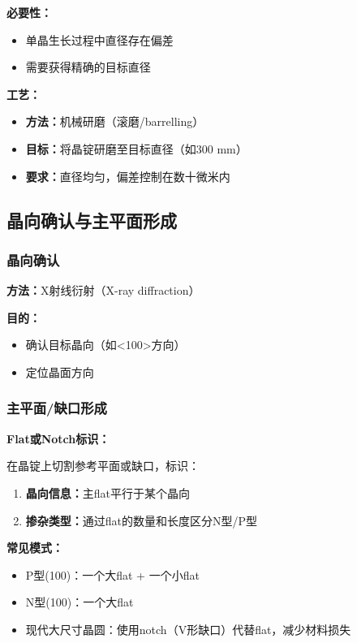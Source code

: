 \documentclass[UTF8,12pt,a4paper]{ctexart}
\begin{document}
\textbf{必要性：}
\begin{itemize}
    \item 单晶生长过程中直径存在偏差
    \item 需要获得精确的目标直径
\end{itemize}

\textbf{工艺：}
\begin{itemize}
    \item \textbf{方法：}机械研磨（滚磨/barrelling）
    \item \textbf{目标：}将晶锭研磨至目标直径（如300 mm）
    \item \textbf{要求：}直径均匀，偏差控制在数十微米内
\end{itemize}

\subsection{晶向确认与主平面形成}

\subsubsection{晶向确认}

\textbf{方法：}X射线衍射（X-ray diffraction）

\textbf{目的：}
\begin{itemize}
    \item 确认目标晶向（如<100>方向）
    \item 定位晶面方向
\end{itemize}

\subsubsection{主平面/缺口形成}

\textbf{Flat或Notch标识：}

在晶锭上切割参考平面或缺口，标识：
\begin{enumerate}
    \item \textbf{晶向信息：}主flat平行于某个晶向
    \item \textbf{掺杂类型：}通过flat的数量和长度区分N型/P型
\end{enumerate}

\textbf{常见模式：}
\begin{itemize}
    \item P型(100)：一个大flat + 一个小flat
    \item N型(100)：一个大flat
    \item 现代大尺寸晶圆：使用notch（V形缺口）代替flat，减少材料损失
\end{itemize}
\end{document}
